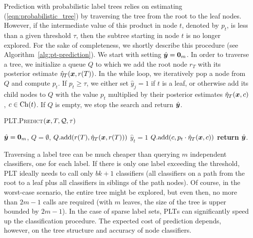 \documentclass{article}
\newcommand{\Algo}[1]{\textsc{#1}}
\begin{document}
Prediction with probabilistic label trees relies on estimating (\ref{eqn:probabilistic_tree}) by traversing the tree from the root to the leaf nodes. However, if the intermediate value of this product in node $t$, denoted by $p_t$, is less than a given threshold $\tau$, then the subtree starting in node $t$ is no longer explored. For the sake of completeness, we shortly describe this procedure (see Algorithm~\ref{alg:pt-prediction}). We start with setting $\hat{\boldsymbol{y}} = \boldsymbol{0}_m$. In order to traverse a tree, we initialize a queue $Q$ to which we add the root node $r_T$ with its posterior estimate $\hat{\eta}_T(\boldsymbol{x},r(T))$. In the while loop, we iteratively pop a node from $Q$ and compute $p_t$. If $p_t \ge \tau$, we either set $\hat{y}_j = 1$ if $t$ is a leaf, or otherwise add its child nodes to $Q$ with the value $p_t$ multiplied by their posterior estimates $\hat{\eta}_T(\boldsymbol{x}, c)$, $c \in \mathrm{Ch}(t)$. If $Q$ is empty, we stop the search and return $\hat{\boldsymbol{y}}$.

\begin{algorithm}[t]
\caption{\Algo{PLT.Predict}$(\boldsymbol{x}, T, \mathcal{Q}, \tau)$}%
\label{alg:pt-prediction}
\begin{algorithmic}[1]
\State $\hat{\boldsymbol{y}} = \boldsymbol{0}_m$, $Q = \emptyset$, $Q.\mathrm{add}(r(T),\hat{\eta}_T(\boldsymbol{x},r(T)))$ 
\State $\hat{y}_t = 1$ 
\Else
{} 
\State $Q.\mathrm{add}(c, p_t \cdot \hat{\eta}_T(\boldsymbol{x},c))$ 
\EndFor
\EndIf
\EndIf
\EndWhile
\State \textbf{return} $\hat{\boldsymbol{y}}$. 
\end{algorithmic}
\end{algorithm} 


Traversing a label tree can be much cheaper than querying $m$ independent classifiers, one for each label. If there is only one label exceeding the threshold, \Algo{PLT} ideally needs to call only $bk+1$ classifiers (all classifiers on a path from the root to a leaf plus all classifiers in siblings of the path nodes). Of course, in the worst-case scenario, the entire tree might be explored, but even then, no more than $2m-1$ calls are required (with $m$ leaves, the size of the tree is upper bounded by $2m-1$). In the case of sparse label sets, \Algo{PLT}s can significantly speed up the classification procedure. The expected cost of prediction depends, however, on the tree structure and accuracy of node classifiers.
\end{document}
